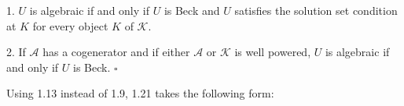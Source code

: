 1. $U$ is algebraic if and only if $U$ is Beck and $U$ satisfies the solution set condition at $K$ for every object $K$ of $\mathcal{K}$.

2. If $\mathcal{A}$ has a cogenerator and if either $\mathcal{A}$ or $\mathcal{K}$ is well powered, $U$ is algebraic if and only if $U$ is Beck. $\square$

Using 1.13 instead of 1.9, 1.21 takes the following form: